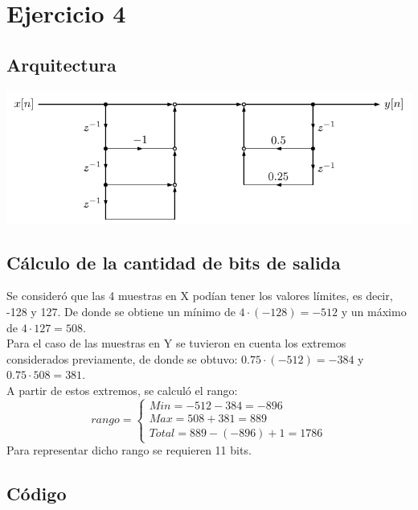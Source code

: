 \section{Ejercicio 4}
\subsection{Arquitectura}
\begin{center}
    \includegraphics[width=\linewidth]{../iir_filter/draw/draw.pdf}
\end{center}

\subsection{Cálculo de la cantidad de bits de salida}
Se consideró que las 4 muestras en X podían tener los valores límites, es decir, -128 y 127. De donde se obtiene un mínimo de $4\cdot(-128) = -512$ y un máximo de $4\cdot127 = 508$.\\

Para el caso de las muestras en Y se tuvieron en cuenta los extremos considerados previamente, de donde se obtuvo: $0.75\cdot(-512) = -384$ y $0.75\cdot508 = 381$.\\

A partir de estos extremos, se calculó el rango:
\[
    rango =
    \begin{cases}
        Min = -512-384 = -896\\
        Max = 508+381 = 889\\
        Total = 889 - (-896) + 1 = 1786
    \end{cases}
\]
Para representar dicho rango se requieren 11 bits.

\subsection{Código}
\inputminted[fontsize=\footnotesize]{systemverilog}{../iir_filter/rtl/iir_filter.sv}

